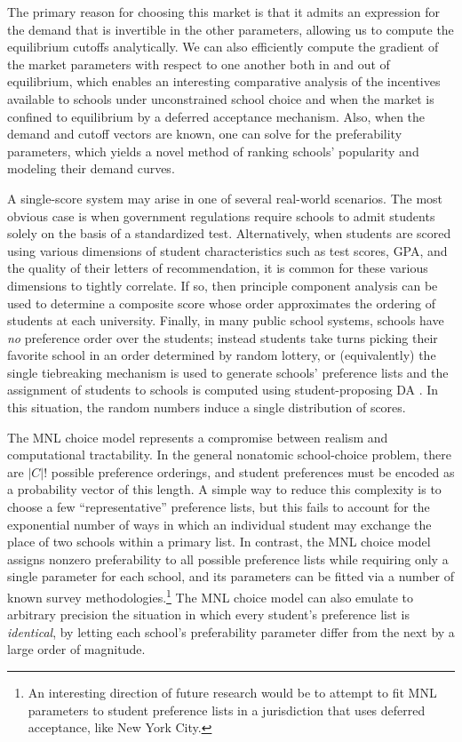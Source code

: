 \documentclass[12pt]{article}
\numberwithin{equation}{subsection}
\theoremstyle{definition}
\begin{document}
The primary reason for choosing this market is that it admits an expression for the demand that is invertible in the other parameters, allowing us to compute the equilibrium cutoffs analytically. We can also efficiently compute the gradient of the market parameters with respect to one another both in and out of equilibrium, which enables an interesting comparative analysis of the incentives available to schools under unconstrained school choice and when the market is confined to equilibrium by a deferred acceptance mechanism. Also, when the demand and cutoff vectors are known, one can solve for the preferability parameters, which yields a novel method of ranking schools' popularity and modeling their demand curves.

A single-score system may arise in one of several real-world scenarios. The most obvious case is when government regulations require schools to admit students solely on the basis of a standardized test. Alternatively, when students are scored using various dimensions of student characteristics such as test scores, GPA, and the quality of their letters of recommendation, it is common for these various dimensions to tightly correlate. If so, then principle component analysis can be used to determine a composite score whose order approximates the ordering of students at each university. Finally, in many public school systems, schools have \emph{no} preference order over the students; instead students take turns picking their favorite school in an order determined by random lottery, or (equivalently) the single tiebreaking mechanism is used to generate schools’ preference lists and the assignment of students to schools is computed using student-proposing DA \parencite[][]{whatmatters}. In this situation, the random numbers induce a single distribution of scores.

The MNL choice model represents a compromise between realism and computational tractability. In the general nonatomic school-choice problem, there are $|C|!$ possible preference orderings, and student preferences must be encoded as a probability vector of this length. A simple way to reduce this complexity is to choose a few ``representative'' preference lists, but this fails to account for the exponential number of ways in which an individual student may exchange the place of two schools within a primary list. In contrast, the MNL choice model assigns nonzero preferability to all possible preference lists while requiring only a single parameter for each school, and its parameters can be fitted via a number of known survey methodologies.\footnote{An interesting direction of future research would be to attempt to fit MNL parameters to student preference lists in a jurisdiction that uses deferred acceptance, like New York City.} The MNL choice model can also emulate to arbitrary precision the situation in which every student's preference list is \emph{identical}, by letting each school's preferability parameter differ from the next by a large order of magnitude. 
\end{document}
